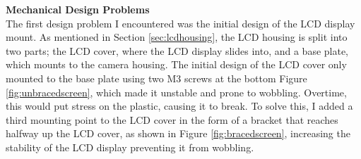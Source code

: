 \noindent
\textbf{Mechanical Design Problems} \\
The first design problem I encountered was the initial design of the LCD display mount. As mentioned in Section \ref*{sec:lcdhousing},
the LCD housing is split into two parts; the LCD cover, where the LCD display slides into, and a base plate, which mounts to the camera housing.
The initial design of the LCD cover only mounted to the base plate using two M3 screws at the bottom Figure \ref*{fig:unbracedscreen}, which made it unstable and prone to wobbling.
Overtime, this would put stress on the plastic, causing it to break. To solve this, I added a third mounting point to the LCD cover in the form of a 
bracket that reaches halfway up the LCD cover, as shown in Figure \ref*{fig:bracedscreen}, increasing the stability of the LCD display preventing it from wobbling.

